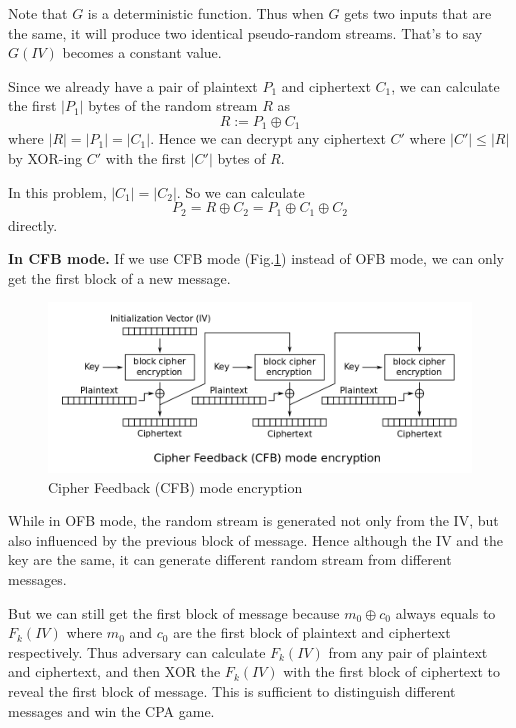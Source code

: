 Note that $G$ is a deterministic function. Thus when $G$ gets two inputs that are the same, it will produce two identical pseudo-random streams. That's to say $G(IV)$ becomes a constant value.

Since we already have a pair of plaintext $P_1$ and ciphertext $C_1$, we can calculate the first $|P_1|$ bytes of the random stream $R$ as $$
    R := P_1 \oplus C_1
$$ where $|R| = |P_1| = |C_1|$. Hence we can decrypt any ciphertext $C'$ where $|C'| \leq |R|$ by XOR-ing $C'$ with the first $|C'|$ bytes of $R$.

In this problem, $|C_1| = |C_2|$. So we can calculate $$
    P_2 = R \oplus C_2 = P_1 \oplus C_1 \oplus C_2
$$ directly.

\textbf{In CFB mode.}
If we use CFB mode (Fig.\ref{fig:CFB_encryption}) instead of OFB mode, we can only get the first block of a new message.

\begin{figure}[ht]
\centering
\includegraphics[width=\columnwidth]{pictures/CFB_encryption.png}
\caption{
    Cipher Feedback (CFB) mode encryption
}
\label{fig:CFB_encryption}
\end{figure}

While in OFB mode, the random stream is generated not only from the IV, but also influenced by the previous block of message. 
Hence although the IV and the key are the same, it can generate different random stream from different messages.

But we can still get the first block of message because $m_0 \oplus c_0$ always equals to $F_k(IV)$ where $m_0$ and $c_0$ are the first block of plaintext and ciphertext respectively. 
Thus adversary can calculate $F_k(IV)$ from any pair of plaintext and ciphertext, and then XOR the $F_k(IV)$ with the first block of ciphertext to reveal the first block of message.
This is sufficient to distinguish different messages and win the CPA game.

\subsubsection{}

